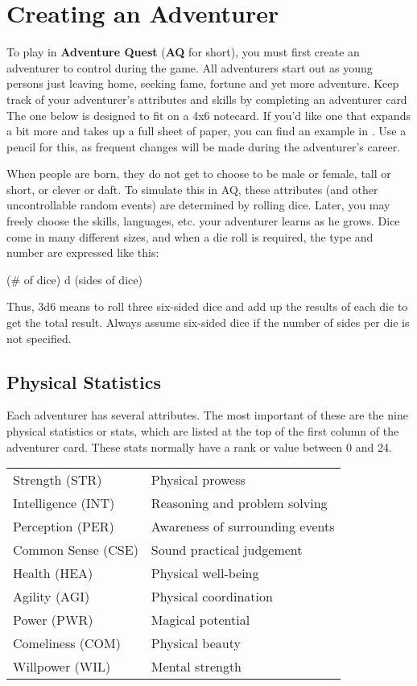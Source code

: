 \chapter{Creating an Adventurer}
\label{ch:create-adventurer}
To play in \textbf{Adventure Quest} (\textbf{AQ} for short), you must first create an adventurer to control during the game. All adventurers start out as young persons just leaving home, seeking fame, fortune and yet more adventure. Keep track of your adventurer's attributes and skills by completing an adventurer card The one below is designed to fit on a 4x6 notecard. If you'd like one that expands a bit more and takes up a full sheet of paper, you can find an example in . Use a pencil for this, as frequent changes will be made during the adventurer's career.

\smallskip
When people are born, they do not get to choose to be male or female, tall or short, or clever or daft. To simulate this in AQ, these attributes (and other uncontrollable random events) are determined by rolling dice. Later, you may freely choose the skills, languages, etc. your adventurer learns as he grows. Dice come in many different sizes, and when a die roll is required, the type and number are expressed like this:
\begin{nscenter}
(\# of dice) d (sides of dice)
\end{nscenter}
Thus, 3d6 means to roll three six-sided dice and add up the results of each die to get the total result. Always assume six-sided dice if the number of sides per die is not specified.
\section{Physical Statistics}

Each adventurer has several attributes. The most important of these are the nine physical statistics or stats, which are listed at the top of the first column of the adventurer card. These stats normally have a rank or value between 0 and 24.

\noindent\begin{normboxc}
\small
\begin{tabular}{@{}l l}
Strength (STR) & Physical prowess\\
Intelligence (INT) & Reasoning and problem solving\\
Perception (PER) & Awareness of surrounding events\\
Common Sense (CSE) & Sound practical judgement\\
Health (HEA) & Physical well-being\\
Agility (AGI) & Physical coordination\\
Power  (PWR) &  Magical potential\\
Comeliness (COM) & Physical beauty\\
Willpower (WIL) & Mental strength\\
\end{tabular}
\normalsize
\end{normboxc}

